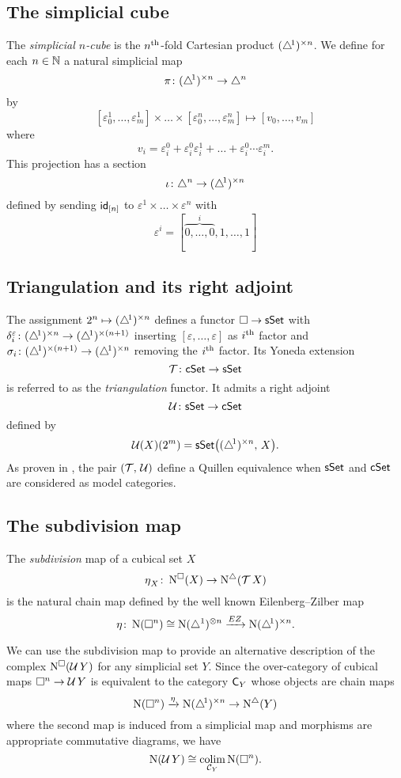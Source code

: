 \subsection{The simplicial cube} \label{ss:simplicial cube}

The \textit{simplicial $n$-cube} is the $n^{\mathrm{th}}$-fold Cartesian product $(\triangle^{\!1})^{\times n}$.
We define for each $n \in \mathbb{N}$ a natural simplicial map
\[
\operatorname{\pi} \colon (\triangle^{\!1})^{\times n} \to \triangle^n
\]
by
\[
[\varepsilon_0^1, \dots, \varepsilon_m^1] \times \dots \times [ \varepsilon_0^n, \dots, \varepsilon_m^n] \mapsto
[v_0, \dots, v_m]
\]
where
\[
v_i = \varepsilon_i^0 + \varepsilon_i^0 \varepsilon_i^1 + \dots + \varepsilon_i^0 \dotsm \varepsilon_i^m.
\]
This projection has a section
\[
\operatorname{\iota} \colon \triangle^n \to (\triangle^{\!1})^{\times n}
\]
defined by sending $\mathsf{id}_{[n]}$ to $\varepsilon^1 \times \dots \times \varepsilon^n$ with
\[
\varepsilon^i = [\overbrace{0, \dots, 0}^{i}, 1, \dots, 1]
\]

\subsection{Triangulation and its right adjoint}

The assignment $2^n \mapsto (\triangle^{\!1})^{\times n}$ defines a functor $\square \to \mathsf{sSet}$ with $\delta_i^\varepsilon \colon (\triangle^{\!1})^{\times n} \to (\triangle^{\!1})^{\times (n+1)}$ inserting $[\varepsilon, \dots, \varepsilon]$ as $i^{\mathrm{th}}$ factor and $\sigma_i \colon (\triangle^{\!1})^{\times (n+1)} \to (\triangle^{\!1})^{\times n}$ removing the $i^{\mathrm{th}}$ factor.
Its Yoneda extension
\[
\operatorname{\mathcal{T}} \colon \mathsf{cSet} \to \mathsf{sSet}
\]
is referred to as the \textit{triangulation} functor.
It admits a right adjoint
\[
\operatorname{\mathcal{U}} \colon \mathsf{sSet} \to \mathsf{cSet}
\]
defined by
\[
\operatorname{\mathcal{U}}(X)(2^m) = \mathsf{sSet} \big( (\triangle^{\!1})^{\times n}, \, X \big).
\]
As proven in \cite[8.4.30]{cisinski2006presheaves}, the pair $(\operatorname{\mathcal{T}},\, \operatorname{\mathcal{U}})$ define a Quillen equivalence when $\mathsf{sSet}$ and $\mathsf{cSet}$ are considered as model categories.

\subsection{The subdivision map}

The \textit{subdivision} map of a cubical set $X$
\[
\operatorname{\eta}_X \colon \operatorname{N^{\square}}(X) \to \operatorname{N^{\triangle}}(\operatorname{\mathcal{T}} X)
\]
is the natural chain map defined by the well known Eilenberg--Zilber map
\[
\operatorname{\eta} \colon \operatorname{N}(\square^n) \cong \operatorname{N}(\triangle^1)^{\otimes n} \xrightarrow{EZ} \operatorname{N} (\triangle^{\!1})^{\times n}.
\]

We can use the subdivision map to provide an alternative description of the complex $\operatorname{N^{\square}}(\operatorname{\mathcal{U}} Y)$ for any simplicial set $Y$.
Since the over-category of cubical maps $\square^n \to \operatorname{\mathcal{U}} Y$ is equivalent to the category $\mathsf{C}_Y$ whose objects are chain maps
\[
\operatorname{N}(\square^n) \xrightarrow{\operatorname{\eta}} \operatorname{N} (\triangle^{\!1})^{\times n} \to \operatorname{N^{\triangle}}(Y)
\]
where the second map is induced from a simplicial map
and morphisms are appropriate commutative diagrams, we have
\begin{equation} \label{e:alternative description of NUY}
\operatorname{N}(\operatorname{\mathcal{U}} Y) \cong \operatorname*{colim}_{\mathcal{C}_Y} \operatorname{N}(\square^n).
\end{equation}

